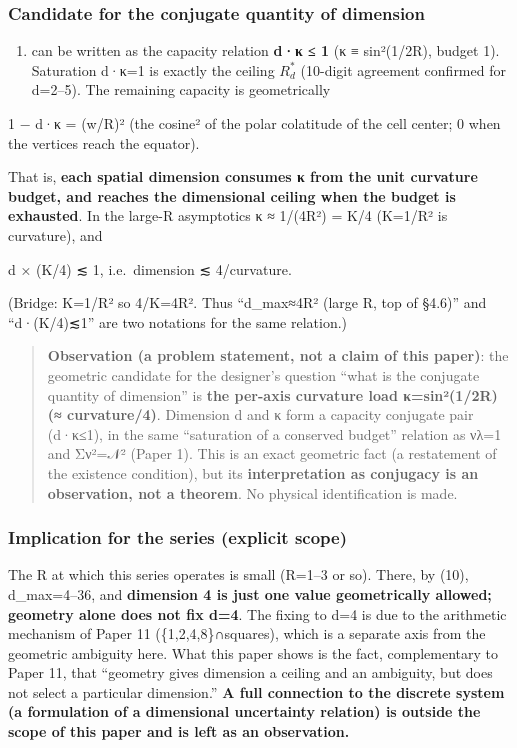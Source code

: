 \documentclass[
]{ltjsarticle}
\providecommand{\tightlist}{%
  \setlength{\itemsep}{0pt}\setlength{\parskip}{0pt}}
\begin{document}
\subsubsection{Candidate for the conjugate quantity of
dimension}\label{candidate-for-the-conjugate-quantity-of-dimension}

\begin{enumerate}
\def\labelenumi{(\arabic{enumi})}
\setcounter{enumi}{9}
\tightlist
\item
  can be written as the capacity relation \textbf{d·κ ≤ 1} (κ ≡
  sin²(1/2R), budget 1). Saturation d·κ=1 is exactly the ceiling
  \(R^{*}_{d}\) (10-digit agreement confirmed for d=2--5). The remaining
  capacity is geometrically
\end{enumerate}

1 − d·κ = (w/R)² (the cosine² of the polar colatitude of the cell
center; 0 when the vertices reach the equator).

That is, \textbf{each spatial dimension consumes κ from the unit
curvature budget, and reaches the dimensional ceiling when the budget is
exhausted}. In the large-R asymptotics κ ≈ 1/(4R²) = K/4 (K=1/R² is
curvature), and

d × (K/4) ≲ 1, i.e.~dimension ≲ 4/curvature.

(Bridge: K=1/R² so 4/K=4R². Thus ``d\_max≈4R² (large R, top of §4.6)''
and ``d·(K/4)≲1'' are two notations for the same relation.)

\begin{quote}
\textbf{Observation (a problem statement, not a claim of this paper)}:
the geometric candidate for the designer's question ``what is the
conjugate quantity of dimension'' is \textbf{the per-axis curvature load
κ=sin²(1/2R) (≈ curvature/4)}. Dimension d and κ form a capacity
conjugate pair (d·κ≤1), in the same ``saturation of a conserved budget''
relation as νλ=1 and Σν²=𝒩² (Paper 1). This is an exact geometric fact
(a restatement of the existence condition), but its
\textbf{interpretation as conjugacy is an observation, not a theorem}.
No physical identification is made.
\end{quote}

\subsubsection{Implication for the series (explicit
scope)}\label{implication-for-the-series-explicit-scope}

The R at which this series operates is small (R=1--3 or so). There, by
(10), d\_max=4--36, and \textbf{dimension 4 is just one value
geometrically allowed; geometry alone does not fix d=4}. The fixing to
d=4 is due to the arithmetic mechanism of Paper 11
(\{1,2,4,8\}∩squares), which is a separate axis from the geometric
ambiguity here. What this paper shows is the fact, complementary to
Paper 11, that ``geometry gives dimension a ceiling and an ambiguity,
but does not select a particular dimension.'' \textbf{A full connection
to the discrete system (a formulation of a dimensional uncertainty
relation) is outside the scope of this paper and is left as an
observation.}
\end{document}
